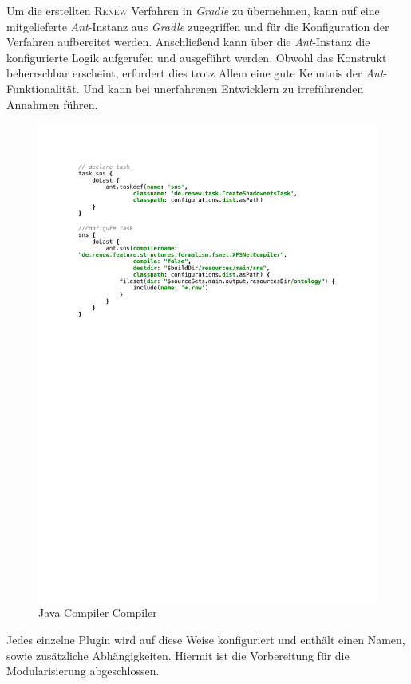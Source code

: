 	Um die erstellten \textsc{Renew} Verfahren in \textit{Gradle} zu übernehmen, kann auf eine mitgelieferte \textit{Ant}-Instanz aus \textit{Gradle} zugegriffen und für die Konfiguration der Verfahren aufbereitet werden. Anschließend kann über die \textit{Ant}-Instanz die konfigurierte Logik aufgerufen und ausgeführt werden. Obwohl das Konstrukt beherrschbar erscheint, erfordert dies trotz Allem eine gute Kenntnis der \textit{Ant}-Funktionalität. Und kann bei unerfahrenen Entwicklern zu irreführenden Annahmen führen.
	\begin{figure}[h!]
		\centering
		\includegraphics[width=\textwidth]{material/images/gradle/antTasks.pdf}
		\caption{Java Compiler Compiler}
		\label{fig:javaccAnt}
  	\end{figure}


	Jedes einzelne Plugin wird auf diese Weise konfiguriert und enthält einen Namen, sowie zusätzliche Abhängigkeiten. Hiermit ist die Vorbereitung für die Modularisierung abgeschlossen.


